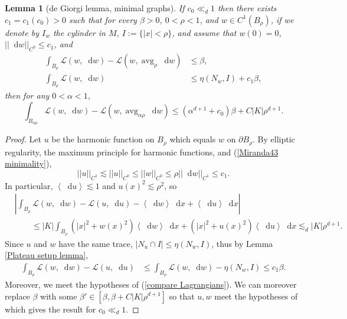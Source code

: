 \documentclass[reqno,10pt]{amsart}
\DeclareMathOperator{\avg}{avg}
\newcommand*\dif{\mathop{}\!\mathrm{d}}
\newcommand{\Lagrange}{\mathscr L}
\def\Japan#1{\left \langle #1 \right \rangle}
\newtheorem{lemma}[theorem]{Lemma}
\theoremstyle{definition}
\numberwithin{equation}{section}
\begin{document}
\begin{lemma}[de Giorgi lemma, minimal graphs]\label{Miranda43}
If $c_0 \ll_d 1$ then there exists $c_1 = c_1(c_0) > 0$ such that for every $\beta > 0$, $0 < \rho < 1$, and $w \in C^1(B_\rho)$, if we denote by 
$I_w$ the cylinder in $M$, $I := \{|x| < \rho\}$, and assume that $w(0) = 0$, $||\dif w||_{C^0} \leq c_1$, and
\begin{align}
\int_{B_\rho} \Lagrange(w, \dif w) - \Lagrange(w, \avg_\rho \dif w) &\leq \beta \label{Miranda43 oscillation}, \\
\int_{B_\rho} \Lagrange(w, \dif w) &\leq \eta(N_w, I) + c_1 \beta \label{Miranda43 minimality},
\end{align}
then for any $0 < \alpha < 1$,
\begin{equation}\label{Miranda43 concl}
\int_{B_{\alpha \rho}} \Lagrange(w, \dif w) - \Lagrange(w, \avg_{\alpha \rho} \dif w) \leq (\alpha^{d + 1} + c_0) \beta + C|K|\rho^{d + 1}.
\end{equation}
\end{lemma}
\begin{proof}
Let $u$ be the harmonic function on $B_\rho$ which equals $w$ on $\partial B_\rho$.
By elliptic regularity, the maximum principle for harmonic functions, and (\ref{Miranda43 minimality}),
$$||u||_{C^1} \lesssim ||u||_{C^0} \leq ||w||_{C^0} \leq \rho ||\dif w||_{C^1} \leq c_1.$$
In particular, $\Japan{\dif u} \lesssim 1$ and $u(x)^2 \lesssim \rho^2$, so
\begin{align*}
&\left|\int_{B_\rho} \Lagrange(w, \dif w) - \Lagrange(u, \dif u) - \Japan{\dif w} \dif x + \Japan{\dif u} \dif x\right| \\
&\qquad \leq |K| \int_{B_\rho} (|x|^2 + w(x)^2) \Japan{\dif w} \dif x + (|x|^2 + u(x)^2) \Japan{\dif u} \dif x 
\lesssim_d |K| \rho^{d + 1}.
\end{align*}
Since $u$ and $w$ have the same trace, $|N_u \cap I| \leq \eta(N_w, I)$, thus by Lemma \ref{Plateau setup lemma},
\begin{align*}
\int_{B_\rho} \Lagrange(w, \dif w) - \Lagrange(u, \dif u) &\leq \int_{B_\rho} \Lagrange(w, \dif w) - \eta(N_w, I) \leq c_1 \beta.
\end{align*}
Moreover, we meet the hypotheses of (\ref{compare Lagrangians}).
We can moreover replace $\beta$ with some $\beta' \in [\beta, \beta + C|K|\rho^{d + 1}]$ so that $u, w$ meet the hypotheses of \cite[Lemma 4.2]{Giusti77} which gives the result for $c_0 \ll_d 1$.
\end{proof}
\end{document}
